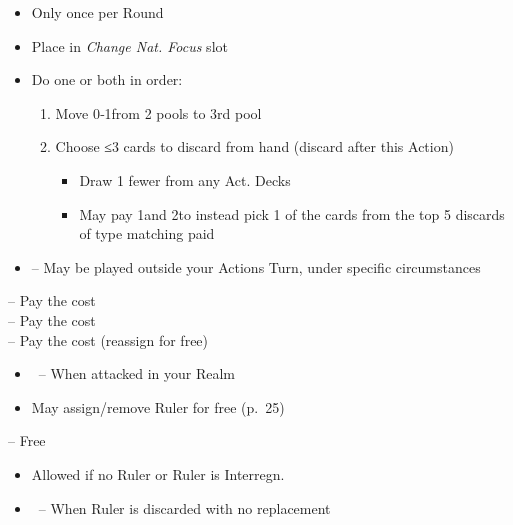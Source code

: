 \documentclass[10pt]{article}
\begin{document}
\begin{itemize}
	\item Only once per Round
	\item Place \cube in \emph{Change Nat. Focus} slot
	\item Do one or both in order:
	\begin{enumerate}
		\item Move 0‑1\monarchpower from 2 pools to 3rd pool
		\item Choose ≤3 cards to discard from hand (discard after this Action)
		\begin{itemize}
			\item Draw 1 fewer from any Act. Decks
			\item May pay 1\monarchpower and 2\ducats to instead pick 1 of the cards from the top 5 discards of type matching paid \monarchpower
		\end{itemize}
	\end{enumerate}
\end{itemize}

\begin{itemize}
	\item \reaction -- May be played outside your Actions Turn, under specific circumstances
\end{itemize}
 -- Pay the \ducat cost\\
 -- Pay the \milpower cost\\
 -- Pay the \milpower cost (reassign for free)\\
\begin{itemize}
	\item \reaction~-- When attacked in your Realm
	\item May assign/remove Ruler for free (p.~25)
\end{itemize}
 -- Free
\begin{itemize}
	\item Allowed if no Ruler or Ruler is \dprime Interregn.\dprime
	\item \reaction~-- When Ruler is discarded with no replacement
\end{itemize}
\end{document}

